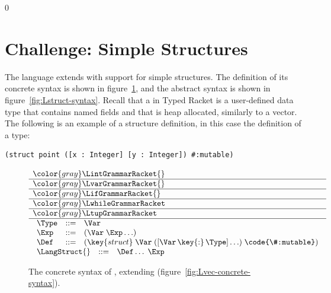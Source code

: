 \documentclass[7x10]{TimesAPriori_MIT}%
\newcommand{\gray}[1]{{\color{gray} #1}}
\def\racketEd{0}
\def\edition{0}
\numberwithin{theorem}{chapter}
\numberwithin{definition}{chapter}
\numberwithin{equation}{chapter}
\begin{document}
{\if\edition\racketEd
\section{Challenge: Simple Structures}
\label{sec:simple-structures}

The language \LangStruct{} extends \LangVec{} with support for simple
structures. The definition of its concrete syntax is shown in
figure~\ref{fig:Lstruct-concrete-syntax}, and the abstract syntax is
shown in figure~\ref{fig:Lstruct-syntax}. Recall that a 
in Typed Racket is a user-defined data type that contains named fields
and that is heap allocated, similarly to a vector. The following is an
example of a structure definition, in this case the definition of a
 type:
\begin{lstlisting}
(struct point ([x : Integer] [y : Integer]) #:mutable)
\end{lstlisting}

\newcommand{\LstructGrammarRacket}{
\begin{array}{lcl}
  \Type &::=& \Var \\
  \Exp &::=& (\Var\;\Exp \ldots)\\
  \Def &::=& (\key{struct}\; \Var \; ([\Var \,\key{:}\, \Type] \ldots)\; \code{\#:mutable})\\
\end{array}
}
\newcommand{\LstructASTRacket}{
\begin{array}{lcl}
  \Type &::=& \VAR{\Var} \\
  \Exp &::=& \APPLY{\Var}{\Exp\ldots} \\
  \Def &::=& \LP\key{StructDef}\; \Var \; \LP\LS\Var \,\key{:}\, \Type\RS \ldots\RP\RP 
\end{array}
}

\begin{figure}[tbp]
\centering
\begin{tcolorbox}[colback=white]
\[
\begin{array}{l}
  \gray{\LintGrammarRacket{}} \\ \hline
  \gray{\LvarGrammarRacket{}} \\ \hline
  \gray{\LifGrammarRacket{}} \\ \hline
  \gray{\LwhileGrammarRacket} \\ \hline
  \gray{\LtupGrammarRacket} \\  \hline
  \LstructGrammarRacket \\
\begin{array}{lcl}
  \LangStruct{} &::=& \Def \ldots \; \Exp
\end{array}
\end{array}
\]
\end{tcolorbox}
\caption{The concrete syntax of \LangStruct{}, extending \LangVec{}
  (figure~\ref{fig:Lvec-concrete-syntax}).}
\label{fig:Lstruct-concrete-syntax}
\end{figure}

}
\end{document}
